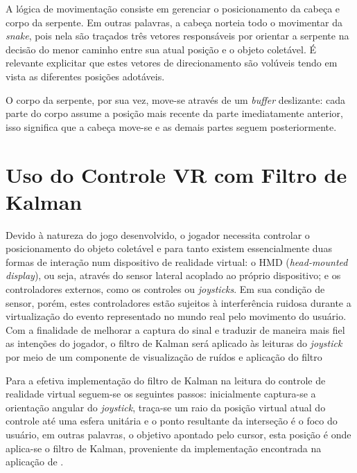 \documentclass{vgtc}                          %
\begin{document}
A lógica de movimentação consiste em gerenciar o posicionamento da cabeça e corpo da serpente.  Em outras palavras, a cabeça norteia todo o movimentar da \textit{snake}, pois nela são traçados três vetores responsáveis por orientar a serpente na decisão do menor caminho entre sua atual posição e o objeto coletável. É relevante explicitar que estes vetores de direcionamento são volúveis tendo em vista as diferentes posições adotáveis.

O corpo da serpente, por sua vez, move-se através de um \textit{buffer} deslizante: cada parte do corpo assume a posição mais recente da parte imediatamente anterior, isso significa que a cabeça move-se e as demais partes seguem posteriormente.

\section{Uso do Controle VR com Filtro de Kalman} \label{sec:gearvrcontroller}

Devido à natureza do jogo desenvolvido, o jogador necessita controlar o posicionamento do objeto coletável e para tanto existem essencialmente duas formas de interação num dispositivo de realidade virtual: o HMD (\textit{head-mounted display}), ou seja, através do sensor lateral acoplado ao próprio dispositivo; e os controladores externos, como os controles ou \textit{joysticks}. Em sua condição de sensor, porém, estes controladores estão sujeitos à interferência ruidosa durante a virtualização do evento representado no mundo real pelo movimento do usuário. Com a finalidade de melhorar a captura do sinal e traduzir de maneira mais fiel as intenções do jogador, o filtro de Kalman será aplicado às leituras do \textit{joystick} por meio de um componente de visualização de ruídos e aplicação do filtro

Para a efetiva implementação do filtro de Kalman na leitura do controle de realidade virtual seguem-se os seguintes passos: inicialmente captura-se a orientação angular do \textit{joystick}, traça-se um raio da posição virtual atual do controle até uma esfera unitária e o ponto resultante da interseção é o foco do usuário, em outras palavras, o objetivo apontado pelo cursor, esta posição é onde aplica-se o filtro de Kalman, proveniente da implementação encontrada na aplicação de \cite{KalmanComponent}.

\end{document}
